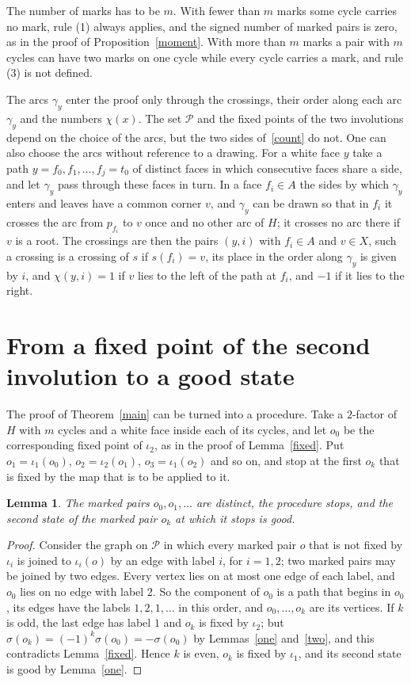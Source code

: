 \documentclass[a4paper]{amsart}
\newtheorem{lemma}[theorem]{Lemma}
\newcommand{\cP}{\mathcal P}
\begin{document}
The number of marks has to be $m$.
With fewer than $m$ marks some cycle carries no mark, rule (1) always applies, and the signed number of marked pairs is zero, as in the proof of Proposition~\ref{moment}.
With more than $m$ marks a pair with $m$ cycles can have two marks on one cycle while every cycle carries a mark, and rule (3) is not defined.

The arcs $\gamma_y$ enter the proof only through the crossings, their order along each arc $\gamma_y$ and the numbers $\chi(x)$.
The set $\cP$ and the fixed points of the two involutions depend on the choice of the arcs, but the two sides of~\eqref{count} do not.
One can also choose the arcs without reference to a drawing.
For a white face $y$ take a path $y=f_0,f_1,\dots,f_j=t_0$ of distinct faces in which consecutive faces share a side, and let $\gamma_y$ pass through these faces in turn.
In a face $f_i\in A$ the sides by which $\gamma_y$ enters and leaves have a common corner $v$, and $\gamma_y$ can be drawn so that in $f_i$ it crosses the arc from $p_{f_i}$ to $v$ once and no other arc of $H$; it crosses no arc there if $v$ is a root.
The crossings are then the pairs $(y,i)$ with $f_i\in A$ and $v\in X$, such a crossing is a crossing of $s$ if $s(f_i)=v$, its place in the order along $\gamma_y$ is given by $i$, and $\chi(y,i)=1$ if $v$ lies to the left of the path at $f_i$, and $-1$ if it lies to the right.

\section{From a fixed point of the second involution to a good state}

The proof of Theorem~\ref{main} can be turned into a procedure.
Take a $2$-factor of $H$ with $m$ cycles and a white face inside each of its cycles, and let $o_0$ be the corresponding fixed point of $\iota_2$, as in the proof of Lemma~\ref{fixed}.
Put $o_1=\iota_1(o_0)$, $o_2=\iota_2(o_1)$, $o_3=\iota_1(o_2)$ and so on, and stop at the first $o_k$ that is fixed by the map that is to be applied to it.

\begin{lemma}\label{walk}
The marked pairs $o_0,o_1,\dots$ are distinct, the procedure stops, and the second state of the marked pair $o_k$ at which it stops is good.
\end{lemma}

\begin{proof}
Consider the graph on $\cP$ in which every marked pair $o$ that is not fixed by $\iota_i$ is joined to $\iota_i(o)$ by an edge with label $i$, for $i=1,2$; two marked pairs may be joined by two edges.
Every vertex lies on at most one edge of each label, and $o_0$ lies on no edge with label $2$.
So the component of $o_0$ is a path that begins in $o_0$, its edges have the labels $1,2,1,\dots$ in this order, and $o_0,\dots,o_k$ are its vertices.
If $k$ is odd, the last edge has label $1$ and $o_k$ is fixed by $\iota_2$; but $\sigma(o_k)=(-1)^k\sigma(o_0)=-\sigma(o_0)$ by Lemmas~\ref{one} and~\ref{two}, and this contradicts Lemma~\ref{fixed}.
Hence $k$ is even, $o_k$ is fixed by $\iota_1$, and its second state is good by Lemma~\ref{one}.
\end{proof}
\end{document}
